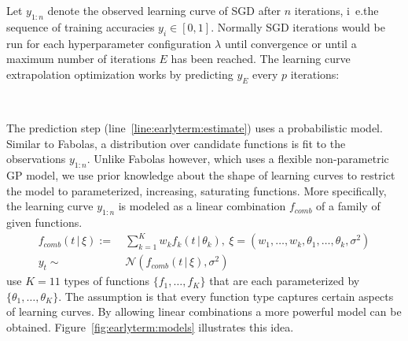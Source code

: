 Let \(y_{1:n}\) denote the observed learning curve of SGD after \(n\) iterations, i~e.\@ the sequence of training accuracies \(y_i \in [0, 1]\).
Normally SGD iterations would be run for each hyperparameter configuration \(\lambda\) until convergence or until a maximum number of iterations \(E\) has been reached.
The learning curve extrapolation optimization works by predicting \(y_E\) every \(p\) iterations:
\begin{algorithmic}[1]
	\Repeat\
		\State{\(n \gets n + p\)}
		\label{line:earlyterm:estimate}
\EndFor\
\end{algorithmic}
The prediction step (line~\ref{line:earlyterm:estimate}) uses a probabilistic model.
Similar to Fabolas, a distribution over candidate functions is fit to the observations \(y_{1:n}\).
Unlike Fabolas however, which uses a flexible non-parametric GP model, we use prior knowledge about the shape of learning curves to restrict the model to parameterized, increasing, saturating functions.
More specifically, the learning curve \(y_{1:n}\) is modeled as a linear combination \(f_{\mathit{comb}}\) of a family of given functions.
\begin{align}
	f_{\mathit{comb}}(t\, |\, \xi) :=&\ \sum_{k = 1}^{K} w_k f_k(t\, |\, \theta_k),\
	\xi = (w_1, \dots, w_k, \theta_1, \dots, \theta_k, \sigma^2) \\
	y_t \sim&\ \mathcal{N}(f_{\mathit{comb}}(t\, |\, \xi), \sigma^2)
\end{align}
\citet{Domhan2015} use \(K = 11\) types of functions \(\{f_1, \dots, f_K\}\) that are each parameterized by \(\{\theta_1, \dots, \theta_K\}\).
The assumption is that every function type captures certain aspects of learning curves.
By allowing linear combinations a more powerful model can be obtained.
Figure~\ref{fig:earlyterm:models} illustrates this idea.
